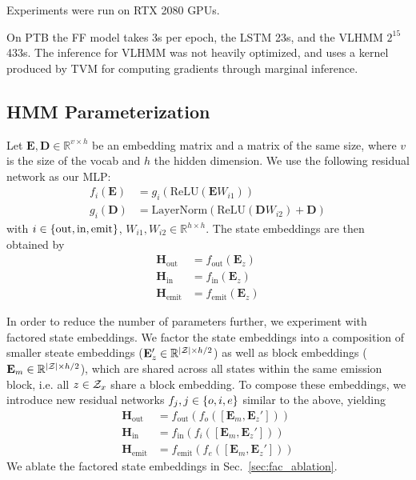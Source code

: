 \documentclass[11pt,a4paper]{article}
\begin{document}
Experiments were run on RTX 2080 GPUs.

On \textsc{PTB} the FF model takes 3s per epoch, the LSTM 23s,
and the VLHMM $2^{15}$ 433s.
The inference for VLHMM was not heavily optimized,
and uses a kernel produced by TVM \citep{tvm} for computing
gradients through marginal inference.

\subsection{HMM Parameterization}
Let $\mathbf{E},\mathbf{D}\in\mathbb{R}^{v \times h}$ be an
embedding matrix and a matrix of the same size,
where $v$ is the size of the vocab and $h$ the hidden dimension.
We use the following residual network as our MLP:
\begin{equation}
\label{eqn:res}
\begin{aligned}
f_i(\mathbf{E}) &= g_i(\textrm{ReLU}(\mathbf{E}W_{i1}))\\
g_i(\mathbf{D}) &= \textrm{LayerNorm}(\textrm{ReLU}(\mathbf{D}W_{i2}) + \mathbf{D})
\end{aligned}
\end{equation}
with $i \in \left\{\textrm{out},\textrm{in},\textrm{emit}\right\}$,
$W_{i1},W_{i2} \in \mathbb{R}^{h \times h}$.
The state embeddings are then obtained by
\begin{equation}
\begin{aligned}
\mathbf{H}_\textrm{out} &= f_\textrm{out}(\mathbf{E}_z)\\
\mathbf{H}_\textrm{in} &= f_\textrm{in}(\mathbf{E}_z)\\
\mathbf{H}_\textrm{emit} &= f_\textrm{emit}(\mathbf{E}_z)
\end{aligned}
\end{equation}

In order to reduce the number of parameters further, we experiment with factored state embeddings. We factor the state embeddings into a composition of smaller steate embeddings ($\mathbf{E}_z'\in\mathbb{R}^{|\mathcal{Z}|\times h/2}$) as well as block embeddings ($\mathbf{E}_m\in\mathbb{R}^{|\mathcal{Z}|\times h/2}$), which are shared across all states within the same emission block, i.e. all $z \in \mathcal{Z}_x$ share a block embedding.
To compose these embeddings, we introduce new residual networks $f_j,j\in\left\{o,i,e\right\}$ similar to the above, yielding
\begin{equation}
\begin{aligned}
\mathbf{H}_\textrm{out} &= f_\textrm{out}(f_o([\mathbf{E}_m,\mathbf{E}_z']))\\
\mathbf{H}_\textrm{in} &= f_\textrm{in}(f_i([\mathbf{E}_m,\mathbf{E}_z']))\\
\mathbf{H}_\textrm{emit} &= f_\textrm{emit}(f_e([\mathbf{E}_m,\mathbf{E}_z']))
\end{aligned}
\end{equation}
We ablate the factored state embeddings in Sec.~\ref{sec:fac_ablation}.
\end{document}
